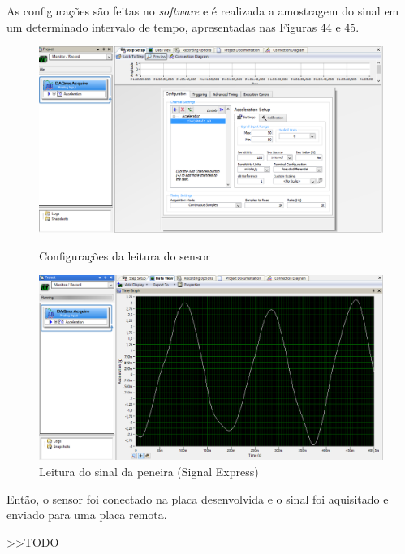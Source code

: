 \documentclass[
	12pt,				%
	openright,			%
	twoside,			%
	a4paper,			%
	english,			%
	french,				%
	spanish,			%
	brazil,				%
	]{abntex2}
\begin{document}
		As configurações são feitas no \textit{software} e é realizada a
		amostragem do sinal em um determinado intervalo de tempo,
		apresentadas nas Figuras 44 e 45.

		\begin{figure}[!ht]
			\centering
			\begin{minipage}{0.4\linewidth}
				\centering
				\includegraphics[width = \linewidth]{../Fotos/configSignalExpress.png}
				\caption{Configurações da leitura do sensor}
			\end{minipage}
			\hfill\vline\hfill
			\begin{minipage}{0.4\linewidth}
				\centering
				\includegraphics[width = \linewidth]{../Fotos/signalExpress3g.png}
				\caption{Leitura do sinal da peneira (Signal Express)}
			\end{minipage}
		\end{figure}

		Então, o sensor foi conectado na placa desenvolvida e o sinal foi
		aquisitado e enviado para uma placa remota. 

		>>TODO

\end{document}
